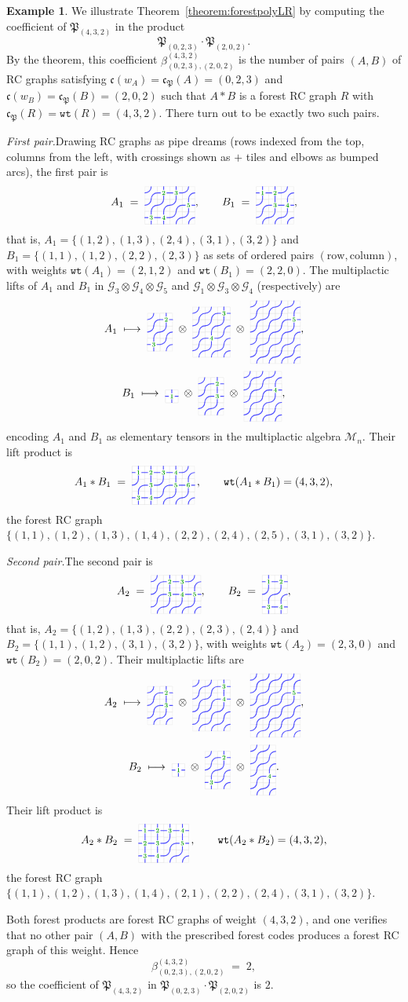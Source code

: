 \documentclass{amsart}
\theoremstyle{definition}
\newtheorem{example}[lemma]{Example}
\theoremstyle{remark}
\numberwithin{equation}{subsection}
\newcommand{\wof}[1]{w_{#1}}
\newcommand{\wtt}{\mathtt{wt}}
\newcommand{\grass}{\mathcal{G}}
\newcommand{\code}{\mathfrak{c}}
\newcommand{\forest}{\mathfrak{P}}
\begin{document}
\begin{example}\label{example:forestlrproduct}
We illustrate Theorem~\ref{theorem:forestpolyLR} by computing the coefficient of $\forest_{(4,3,2)}$ in the product
$$\forest_{(0,2,3)}\cdot\forest_{(2,0,2)}.$$
By the theorem, this coefficient $\beta_{(0,2,3),(2,0,2)}^{(4,3,2)}$ is the number of pairs $(A,B)$ of RC graphs satisfying $\code(\wof{A})=\code_\forest(A)=(0,2,3)$ and $\code(\wof{B})=\code_\forest(B)=(2,0,2)$ such that $A*B$ is a forest RC graph $R$ with $\code_\forest(R)=\wtt(R)=(4,3,2)$. There turn out to be exactly two such pairs.

\smallskip
\noindent\emph{First pair.}\quad Drawing RC graphs as pipe dreams (rows indexed from the top, columns from the left, with crossings shown as $+$ tiles and elbows as bumped arcs), the first pair is
$$A_1 \;=\; \pd{3}{4}{1/2,1/3,2/4,3/1,3/2}, \qquad B_1 \;=\; \pd{3}{3}{1/1,1/2,2/2,2/3},$$
that is, $A_1=\{(1,2),(1,3),(2,4),(3,1),(3,2)\}$ and $B_1=\{(1,1),(1,2),(2,2),(2,3)\}$ as sets of ordered pairs $(\text{row},\text{column})$, with weights $\wtt(A_1)=(2,1,2)$ and $\wtt(B_1)=(2,2,0)$. The multiplactic lifts of $A_1$ and $B_1$ in $\grass_3\otimes\grass_4\otimes\grass_5$ and $\grass_1\otimes\grass_3\otimes\grass_4$ (respectively) are
$$A_1 \;\longmapsto\; \pd{3}{2}{1/2,3/1}\;\otimes\;\pd{4}{3}{1/3,3/2}\;\otimes\;\pd{5}{4}{2/4},$$
$$B_1 \;\longmapsto\; \pd{1}{1}{1/1}\;\otimes\;\pd{3}{2}{1/2,2/2}\;\otimes\;\pd{4}{3}{2/3},$$
encoding $A_1$ and $B_1$ as elementary tensors in the multiplactic algebra $\mathcal{M}_n$. Their lift product is
$$A_1 * B_1 \;=\; \pd{3}{5}{1/1,1/2,1/3,1/4,2/2,2/4,2/5,3/1,3/2}\,, \qquad \wtt(A_1*B_1)=(4,3,2),$$
the forest RC graph $\{(1,1),(1,2),(1,3),(1,4),(2,2),(2,4),(2,5),(3,1),(3,2)\}$.

\smallskip
\noindent\emph{Second pair.}\quad The second pair is
$$A_2 \;=\; \pd{3}{4}{1/2,1/3,2/2,2/3,2/4}, \qquad B_2 \;=\; \pd{3}{2}{1/1,1/2,3/1,3/2},$$
that is, $A_2=\{(1,2),(1,3),(2,2),(2,3),(2,4)\}$ and $B_2=\{(1,1),(1,2),(3,1),(3,2)\}$, with weights $\wtt(A_2)=(2,3,0)$ and $\wtt(B_2)=(2,0,2)$. Their multiplactic lifts are
$$A_2 \;\longmapsto\; \pd{3}{2}{1/2,2/2}\;\otimes\;\pd{4}{3}{1/3,2/3}\;\otimes\;\pd{5}{4}{2/4},$$
$$B_2 \;\longmapsto\; \pd{1}{1}{1/1}\;\otimes\;\pd{3}{2}{1/2,3/1}\;\otimes\;\pd{4}{2}{3/2}.$$
Their lift product is
$$A_2 * B_2 \;=\; \pd{3}{4}{1/1,1/2,1/3,1/4,2/1,2/2,2/4,3/1,3/2}\,, \qquad \wtt(A_2*B_2)=(4,3,2),$$
the forest RC graph $\{(1,1),(1,2),(1,3),(1,4),(2,1),(2,2),(2,4),(3,1),(3,2)\}$.

\smallskip
Both forest products are forest RC graphs of weight $(4,3,2)$, and one verifies that no other pair $(A,B)$ with the prescribed forest codes produces a forest RC graph of this weight. Hence
$$\beta_{(0,2,3),(2,0,2)}^{(4,3,2)} \;=\; 2,$$
so the coefficient of $\forest_{(4,3,2)}$ in $\forest_{(0,2,3)}\cdot\forest_{(2,0,2)}$ is $2$.

\end{example}
\end{document}
